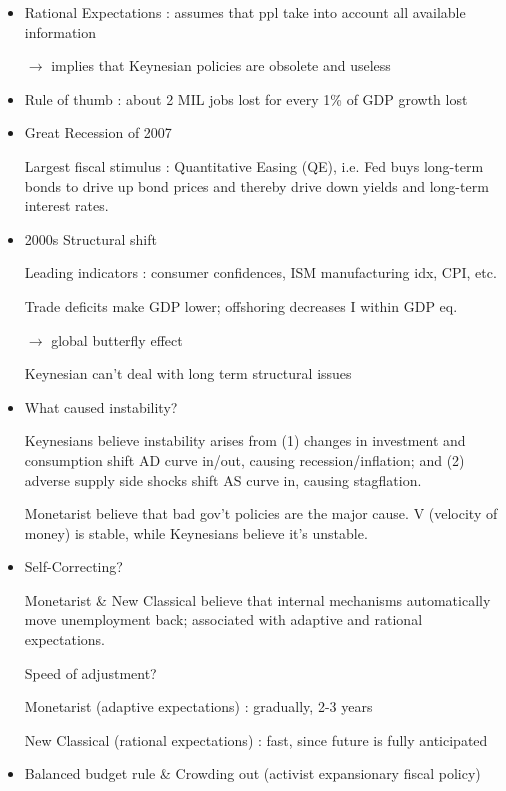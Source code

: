 \documentclass{article}
\begin{document}
\newpage
{}
\begin{itemize}
\item Rational Expectations : assumes that ppl take into account {\color{red} all} available information

$\rightarrow$ implies that Keynesian policies are obsolete and useless

\item Rule of thumb : about 2 MIL jobs lost for every 1\% of GDP growth lost

\item Great Recession of 2007

Largest fiscal stimulus : Quantitative Easing (QE), i.e. Fed buys long-term bonds to drive up bond prices and thereby drive down yields and long-term interest rates.

\item 2000s Structural shift

Leading indicators : consumer confidences, ISM manufacturing idx, CPI, etc.

Trade deficits make GDP lower; offshoring decreases I within GDP eq.

$\rightarrow$ global butterfly effect

Keynesian can't deal with long term structural issues

\item What caused instability?

Keynesians believe instability arises from (1) changes in investment and consumption shift AD curve in/out, causing recession/inflation; and (2) adverse supply side shocks shift AS curve in, causing stagflation.

Monetarist believe that bad gov't policies are the major cause. V (velocity of money) is stable, while Keynesians believe it's unstable.

\item Self-Correcting?

Monetarist \& New Classical believe that internal mechanisms automatically move unemployment back; associated with adaptive and rational expectations.

Speed of adjustment?

Monetarist (adaptive expectations) : gradually, 2-3 years

New Classical (rational expectations) : fast, since future is fully anticipated

\item Balanced budget rule \& Crowding out (activist expansionary fiscal policy)


\end{itemize}
\end{document}
